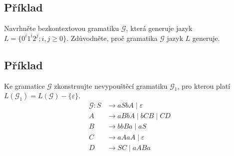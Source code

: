 \subsection{Příklad}
Navrhněte bezkontextovou gramatiku $\mathcal{G}$, která generuje jazyk $L = \{0^i 1^i 2^j; i,j \geq 0\}$. Zdůvodněte, proč gramatika $\mathcal{G}$ jazyk $L$ generuje.

\subsection{Příklad}
Ke gramatice $\mathcal{G}$ zkonstruujte nevypouštěcí gramatiku $\mathcal{G}_1$, pro kterou platí $L(\mathcal{G}_1) = L(\mathcal{G}) - \{\varepsilon\}$.
\begin{align*}
    \mathcal{G}: S &\rightarrow aSbA \mid \varepsilon\\
    A &\rightarrow aBbA \mid bCB \mid CD\\
    B &\rightarrow bbBa \mid aS\\
    C &\rightarrow aAaA \mid \varepsilon\\
    D &\rightarrow SC \mid aABa
\end{align*}
